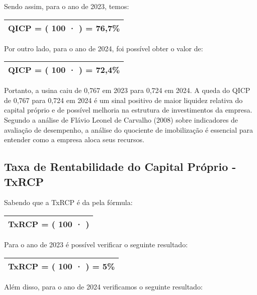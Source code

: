 \documentclass[1pt,a4paper]{article}
\begin{document}
	Sendo assim, para o ano de 2023, temos:
		
		\begin{center}
			\begin{tabular}{|c|}
				\hline
				QICP = \left( 100 · \left[ \frac{2.193.618}{2.859.092} \right] \right) = 76,7\% \\
				\hline
			\end{tabular}
		\end{center}

	Por outro lado, para o ano de 2024, foi possível obter o valor de:
			
		\begin{center}
			\begin{tabular}{|c|}
				\hline
				QICP = \left( 100 · \left[ \frac{2.369.749}{3.270.213} \right] \right) = 72,4\% \\
				\hline
			\end{tabular}
		\end{center}
		
	Portanto, a usina caiu de 0,767 em 2023 para 0,724 em 2024. A queda do QICP de 0,767 para 0,724 em 2024 é um sinal positivo de maior liquidez relativa do capital próprio e de possível melhoria na estrutura de investimentos da empresa. Segundo a análise de Flávio Leonel de Carvalho (2008) sobre indicadores de avaliação de desempenho, a análise do quociente de imobilização é essencial para entender como a empresa aloca seus recursos.
	 
	\subsection{Taxa de Rentabilidade do Capital Próprio - TxRCP}
	
	\hspace*{1.5cm}Sabendo que a TxRCP é da pela fórmula: 
	
		\begin{center}
			\begin{tabular}{|c|}
				\hline
				TxRCP = \left( 100 · \left[ \frac{LUCRO \, LIQUIDO}{ PAT. \, LÍQUIDA} \right] \right)  \\
				\hline
			\end{tabular}
		\end{center}
	Para o ano de 2023 é possível verificar o seguinte resultado:
	
	\begin{center}
		\begin{tabular}{|c|}
			\hline
			TxRCP = \left( 100 · \left[ \frac{140.419}{2.859.092} \right] \right) = 5\% \\
			\hline
		\end{tabular}
	\end{center}
	Além disso, para o ano de 2024 verificamos o seguinte resultado:
	
\end{document}
